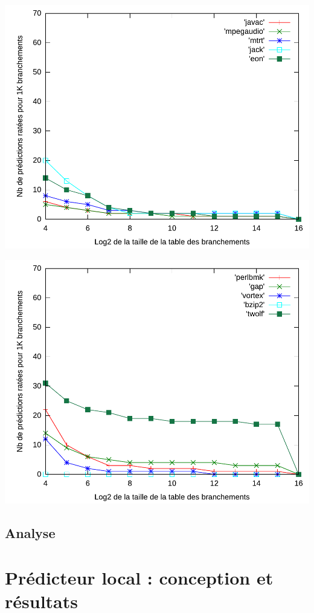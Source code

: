 \documentclass[a4paper]{article}
\begin{document}
\begin{minipage}{.48\linewidth}
\includegraphics[width=\linewidth]{../figures-correle/correle-2}
\end{minipage}%
\hfill
\begin{minipage}{.48\linewidth}
\includegraphics[width=\linewidth]{../figures-correle/correle-3}
\end{minipage}
\subsection{Analyse}

\section{Prédicteur local : conception et résultats}
\end{document}
